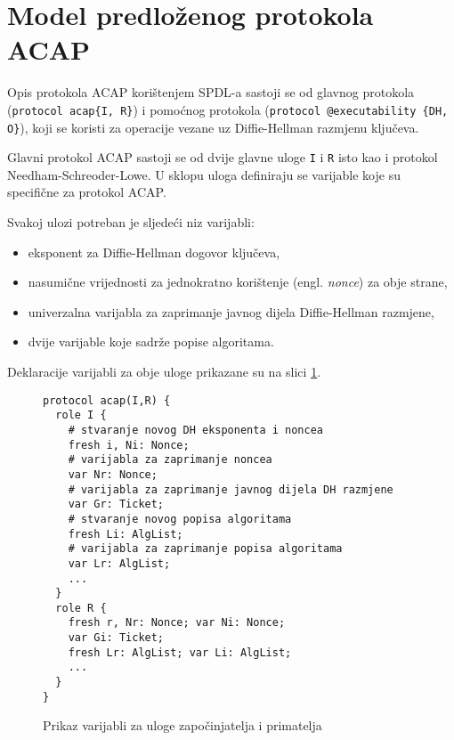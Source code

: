 \begin{figure}[H]
\end{figure}


\section{Model predloženog protokola ACAP}

Opis protokola ACAP korištenjem SPDL-a sastoji se od glavnog protokola
(\texttt{protocol acap\{I, R\}}) i pomoćnog protokola (\texttt{protocol
@executability \{DH, O\}}), koji se koristi za operacije vezane uz
Diffie-Hellman razmjenu ključeva.

Glavni protokol ACAP sastoji se od dvije glavne uloge \texttt{I} i \texttt{R}
isto kao i protokol Needham-Schreoder-Lowe. U sklopu uloga definiraju se
varijable koje su specifične za protokol ACAP.

Svakoj ulozi potreban je sljedeći niz varijabli:
\begin{itemize}
    \item eksponent za Diffie-Hellman dogovor ključeva,
    \item nasumične vrijednosti za jednokratno korištenje (engl. \emph{nonce})
	za obje strane,
    \item univerzalna varijabla za zaprimanje javnog dijela Diffie-Hellman
	razmjene,
    \item dvije varijable koje sadrže popise algoritama.
\end{itemize}
Deklaracije varijabli za obje uloge prikazane su na slici \ref{fig:var_def}. 

\begin{figure}[htb]
\begin{small}
\begin{verbatim}
protocol acap(I,R) {
  role I {
    # stvaranje novog DH eksponenta i noncea
    fresh i, Ni: Nonce;
    # varijabla za zaprimanje noncea
    var Nr: Nonce;
    # varijabla za zaprimanje javnog dijela DH razmjene
    var Gr: Ticket;
    # stvaranje novog popisa algoritama
    fresh Li: AlgList;
    # varijabla za zaprimanje popisa algoritama
    var Lr: AlgList;
    ...
  }
  role R {
    fresh r, Nr: Nonce; var Ni: Nonce;
    var Gi: Ticket;
    fresh Lr: AlgList; var Li: AlgList;
    ...
  }
}
\end{verbatim}
\end{small}
\vspace{-15pt}
\caption{Prikaz varijabli za uloge započinjatelja i primatelja}
\label{fig:var_def}
\end{figure}

